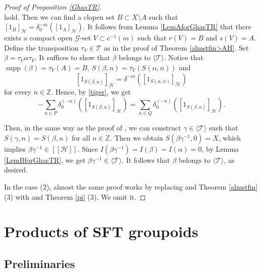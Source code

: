 \documentclass[11pt]{article}
\theoremstyle{definition}
\numberwithin{equation}{section}
\newcommand{\supp}{\operatorname{supp}}
\newcommand{\G}{\mathcal{G}}
\renewcommand{\H}{\mathcal{H}}
\newcommand{\Z}{\mathbb{Z}}
\begin{document}
\begin{proof}[Proof of Proposition \ref{GhasTR}]
\[\]
hold. 
Then we can find a clopen set $B\subset X\setminus A$ 
such that $[1_B]_\H=\delta_0^{-m}([1_A]_\H)$. 
It follows from Lemma \ref{LemAforGhasTR} that 
there exists a compact open $\G$-set $V\subset c^{-1}(m)$ 
such that $r(V)=B$ and $s(V)=A$. 
Define the transposition $\tau_V\in\mathcal{T}$ 
as in the proof of Theorem \ref{almstfin>AH}. 
Set $\beta=\tau_V\alpha\tau_V$. 
It suffices to show that $\beta$ belongs to $\langle\mathcal{T}\rangle$. 
Notice that $\supp(\beta)=\tau_V(A)=B$, $S(\beta,n)=\tau_V(S(\alpha,n))$ 
and 
\[
[1_{S(\beta,n)}]_\H=\delta^{-m}\left([1_{S(\alpha,n)}]_\H\right)
\]
for every $n\in\Z$. 
Hence, by \eqref{tiger}, we get 
\begin{equation}
-\sum_{n\in P}\delta_0^{(-n)}\left([1_{S(\beta,n)}]_\H\right)=
\sum_{n\in Q}\delta_0^{(-n)}\left([1_{S(\beta,n)}]_\H\right). 
\end{equation}

Then, in the same way as the proof of \cite[Lemma 6.10]{M15crelle}, 
we can construct $\gamma\in\langle\mathcal{T}\rangle$ 
such that $S(\gamma,n)=S(\beta,n)$ for all $n\in\Z$. 
Then we obtain $S(\beta\gamma^{-1},0)=X$, 
which implies $\beta\gamma^{-1}\in[[\H]]$. 
Since $I(\beta\gamma^{-1})=I(\beta)=I(\alpha)=0$, 
by Lemma \ref{LemBforGhasTR}, 
we get $\beta\gamma^{-1}\in\langle\mathcal{T}\rangle$. 
It follows that $\beta$ belongs to $\langle\mathcal{T}\rangle$, 
as desired. 

In the case (2), 
almost the same proof works 
by replacing \cite[Lemma 6.7]{M12PLMS} and Theorem \ref{almstfin} (3) 
with \cite[Proposition 4.11]{M15crelle} and Theorem \ref{pi} (3). 
We omit it. 
\end{proof}




\section{Products of SFT groupoids}




\subsection{Preliminaries}
\end{document}
